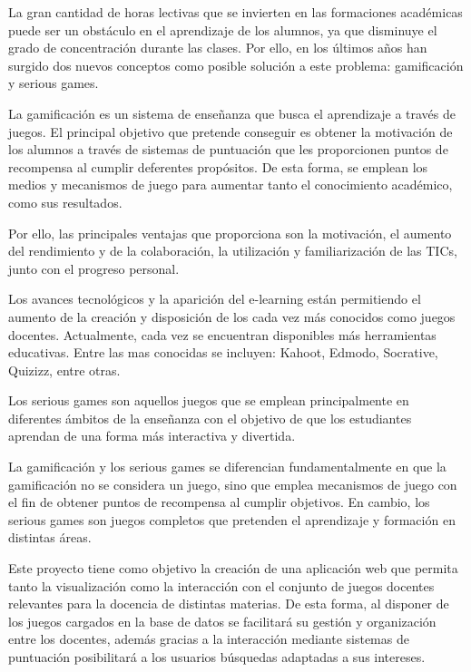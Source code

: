 
La gran cantidad de horas lectivas que se invierten en las formaciones académicas puede ser un obstáculo en el aprendizaje de los alumnos, ya que disminuye el grado de concentración durante las clases. Por ello, en los últimos años han surgido dos nuevos conceptos como posible solución a este problema: gamificación y serious games.

\cite{gamificacion} La gamificación es un sistema de enseñanza que busca el aprendizaje a través de juegos. El principal objetivo que pretende conseguir es obtener la motivación de los alumnos a través de sistemas de puntuación que les proporcionen puntos de recompensa al cumplir deferentes propósitos. De esta forma, se emplean los medios y mecanismos de juego para aumentar tanto el conocimiento académico, como sus resultados. 

Por ello, las principales ventajas que proporciona son la motivación, el aumento del rendimiento y de la colaboración, la utilización y familiarización de las TICs, junto con el progreso personal.

Los avances tecnológicos y la aparición del e-learning están permitiendo el aumento de la creación y disposición de los cada vez más conocidos como juegos docentes. Actualmente, cada vez se encuentran disponibles más herramientas educativas. Entre las mas conocidas se incluyen: Kahoot, Edmodo, Socrative, Quizizz, entre otras.

\cite{serious} Los serious games son aquellos juegos que se emplean principalmente en diferentes ámbitos de la enseñanza con el objetivo de que los estudiantes aprendan de una forma más interactiva y divertida. 

\cite{gamyserious} La gamificación y los serious games se diferencian fundamentalmente en que la gamificación no se considera un juego, sino que emplea mecanismos de juego con el fin de obtener puntos de recompensa al cumplir objetivos. En cambio, los serious games son juegos completos que pretenden el aprendizaje y formación en distintas áreas.

Este proyecto tiene como objetivo la creación de una aplicación web que permita tanto la visualización como la interacción con el conjunto de juegos docentes relevantes para la docencia de distintas materias. De esta forma, al disponer de los juegos cargados en la base de datos se facilitará su gestión y organización entre los docentes, además gracias a la interacción mediante sistemas de puntuación posibilitará a los usuarios búsquedas adaptadas a sus intereses.


